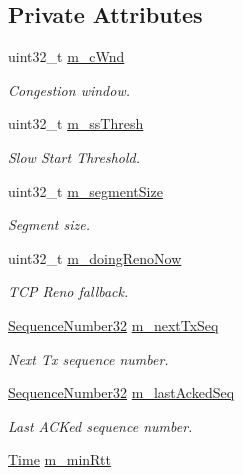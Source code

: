 \subsection*{Private Attributes}
\begin{DoxyCompactItemize}
\item 
uint32\+\_\+t \hyperlink{classTcpYeahDecrementTest_a51e21a89b0f5fcab90370db699a214e5}{m\+\_\+c\+Wnd}
\begin{DoxyCompactList}\small\item\em Congestion window. \end{DoxyCompactList}\item 
uint32\+\_\+t \hyperlink{classTcpYeahDecrementTest_a81f39446eefe8ed13781afe771ec6a84}{m\+\_\+ss\+Thresh}
\begin{DoxyCompactList}\small\item\em Slow Start Threshold. \end{DoxyCompactList}\item 
uint32\+\_\+t \hyperlink{classTcpYeahDecrementTest_a9d6ce4cfe2bb3251f248baa0f44c8cb2}{m\+\_\+segment\+Size}
\begin{DoxyCompactList}\small\item\em Segment size. \end{DoxyCompactList}\item 
uint32\+\_\+t \hyperlink{classTcpYeahDecrementTest_ab8a89641d509b1895ffc3b4f24ef0573}{m\+\_\+doing\+Reno\+Now}
\begin{DoxyCompactList}\small\item\em T\+CP Reno fallback. \end{DoxyCompactList}\item 
\hyperlink{group__network_gacb2070e4e98d2d5135c9bede58f07a03}{Sequence\+Number32} \hyperlink{classTcpYeahDecrementTest_a83b74ea3dcfacc364a72f71df8749c57}{m\+\_\+next\+Tx\+Seq}
\begin{DoxyCompactList}\small\item\em Next Tx sequence number. \end{DoxyCompactList}\item 
\hyperlink{group__network_gacb2070e4e98d2d5135c9bede58f07a03}{Sequence\+Number32} \hyperlink{classTcpYeahDecrementTest_aebd4400138e26b4ccd0c9968be5ca60e}{m\+\_\+last\+Acked\+Seq}
\begin{DoxyCompactList}\small\item\em Last A\+C\+Ked sequence number. \end{DoxyCompactList}\item 
\hyperlink{classns3_1_1Time}{Time} \hyperlink{classTcpYeahDecrementTest_a728d66615946db9e33dc926a6487a998}{m\+\_\+min\+Rtt}

\end{DoxyCompactItemize}
